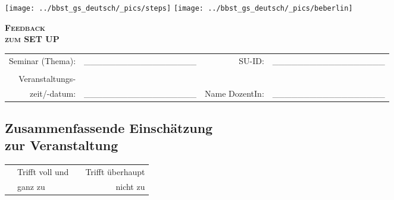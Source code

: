 \documentclass[a4paper]{article}
\begin{document}
\vspace{-0.5cm}

\texttt{[image: ../bbst\_gs\_deutsch/\_pics/steps]} \hspace{4.9cm}
\texttt{[image: ../bbst\_gs\_deutsch/\_pics/beberlin]}

\vspace{.5cm}

\begin{center}
	\textbf{\Huge \scshape Feedback} \\ \vspace{0.3cm}
	\textbf{\huge \scshape zum SET UP}
\end{center}

\vspace{.9cm}

\begin{tabular}{rlrl}
Seminar (Thema): & \_\_\_\_\_\_\_\_\_\_\_\_\_\_\_\_\_\_ &
SU-ID: 					 & \_\_\_\_\_\_\_\_\_\_\_\_\_\_\_\_\_\_ \\
 & \\
Veranstaltungs- & & & \\
zeit/-datum: & \_\_\_\_\_\_\_\_\_\_\_\_\_\_\_\_\_\_ &
Name DozentIn: & \_\_\_\_\_\_\_\_\_\_\_\_\_\_\_\_\_\_
\end{tabular}

\vspace{.5cm}

\subsection*{Zusammenfassende Einschätzung \\ zur Veranstaltung}

\vspace{-1.3cm}

\begin{tabular}{p{7cm} l p{1cm} r}
	& Trifft voll und & & Trifft überhaupt \\
	& ganz zu 				& & nicht zu
\end{tabular}

\vspace{-.1cm}


 \\
\end{document}
